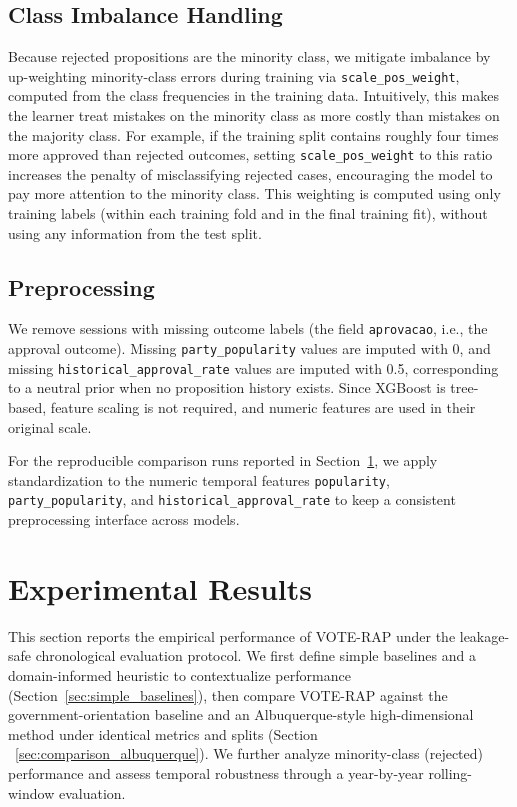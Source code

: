 \documentclass[review]{elsarticle}
\begin{document}
\subsection{Class Imbalance Handling}
Because rejected propositions are the minority class, we mitigate imbalance by up-weighting minority-class errors during training via \texttt{scale\_pos\_weight}, computed from the class frequencies in the training data. Intuitively, this makes the learner treat mistakes on the minority class as more costly than mistakes on the majority class. For example, if the training split contains roughly four times more approved than rejected outcomes, setting \texttt{scale\_pos\_weight} to this ratio increases the penalty of misclassifying rejected cases, encouraging the model to pay more attention to the minority class. This weighting is computed using only training labels (within each training fold and in the final training fit), without using any information from the test split.

\subsection{Preprocessing}
We remove sessions with missing outcome labels (the field \texttt{aprovacao}, i.e., the approval outcome). Missing \texttt{party\_\allowbreak popularity} values are imputed with 0, and missing \texttt{historical\_\allowbreak approval\_\allowbreak rate} values are imputed with 0.5, corresponding to a neutral prior when no proposition history exists. Since XGBoost is tree-based, feature scaling is not required, and numeric features are used in their original scale.
\par
For the reproducible comparison runs reported in Section~\ref{results}, we apply standardization to the numeric temporal features \texttt{popularity}, \texttt{party\_\allowbreak popularity}, and \texttt{historical\_\allowbreak approval\_\allowbreak rate} to keep a consistent preprocessing interface across models.


\section{Experimental Results}
\label{results}

This section reports the empirical performance of VOTE-RAP under the leakage-safe chronological evaluation protocol. We first define simple baselines and a domain-informed heuristic to contextualize performance (Section~\ref{sec:simple_baselines}), then compare VOTE-RAP against the government-orientation baseline and an Albuquerque-style high-dimensional method under identical metrics and splits (Section ~\ref{sec:comparison_albuquerque}). We further analyze minority-class (rejected) performance and assess temporal robustness through a year-by-year rolling-window evaluation.
\end{document}
